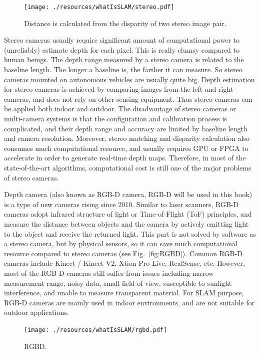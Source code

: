 \begin{figure}
    \centering
    \texttt{[image: ./resources/whatIsSLAM/stereo.pdf]}
    \caption{Distance is calculated from the disparity of two stereo image pair.}
    \label{fig:stereo}
\end{figure}


Stereo cameras usually require significant amount of computational power to (unreliably) estimate depth for each pixel. This is really clumsy compared to human beings. The depth range measured by a stereo camera is related to the baseline length. The longer a baseline is, the farther it can measure. So stereo cameras mounted on autonomous vehicles are usually quite big. Depth estimation for stereo cameras is achieved by comparing images from the left and right cameras, and does not rely on other sensing equipment. Thus stereo cameras can be applied both indoor and outdoor. The disadvantage of stereo cameras or multi-camera systems is that the configuration and calibration process is complicated, and their depth range and accuracy are limited by baseline length and camera resolution. Moreover, stereo matching and disparity calculation also consumes much computational resource, and usually requires GPU or FPGA to accelerate in order to generate real-time depth maps. Therefore, in most of the state-of-the-art algorithms, computational cost is still one of the major problems of stereo cameras.

Depth camera (also known as RGB-D camera, RGB-D will be used in this book) is a type of new cameras rising since 2010. Similar to laser scanners, RGB-D cameras adopt infrared structure of light or Time-of-Flight (ToF) principles, and measure the distance between objects and the camera by actively emitting light to the object and receive the returned light. This part is not solved by software as a stereo camera, but by physical sensors, so it can save much computational resource compared to stereo cameras (see Fig.~\ref{fig:RGBD}). Common RGB-D cameras include Kinect / Kinect V2, Xtion Pro Live, RealSense, etc. However, most of the RGB-D cameras still suffer from issues including narrow measurement range, noisy data, small field of view, susceptible to sunlight interference, and unable to measure transparent material. For SLAM purpose, RGB-D cameras are mainly used in indoor environments, and are not suitable for outdoor applications.
\begin{figure}
    \centering
    \texttt{[image: ./resources/whatIsSLAM/rgbd.pdf]}
    \caption{RGBD.}
    \label{fig:RGBD cameras measurement the distance and can build a point cloud with a single image frame.}
\end{figure}

